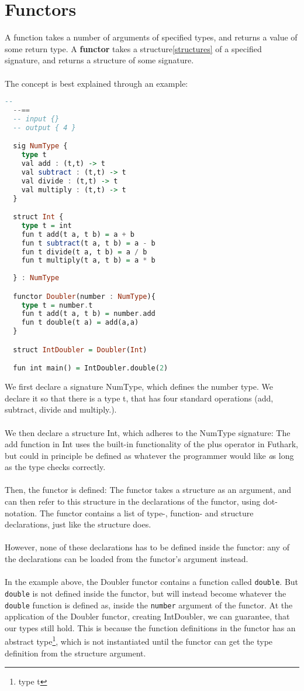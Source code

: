 \section{Functors}
\label{sec:functors}
A function takes a number of arguments of specified types, and returns a value of some return type.
A \textbf{functor} takes a structure\ref{structures} of a specified signature,
and returns a structure of some signature.
\\
\\
The concept is best explained through an example:
\begin{lstlisting}[language=Haskell]
  --
  --==
  -- input {}
  -- output { 4 }

  sig NumType {
    type t
    val add : (t,t) -> t
    val subtract : (t,t) -> t
    val divide : (t,t) -> t
    val multiply : (t,t) -> t
  }

  struct Int {
    type t = int
    fun t add(t a, t b) = a + b
    fun t subtract(t a, t b) = a - b
    fun t divide(t a, t b) = a / b
    fun t multiply(t a, t b) = a * b
    
  } : NumType

  functor Doubler(number : NumType){
    type t = number.t
    fun t add(t a, t b) = number.add
    fun t double(t a) = add(a,a) 
  }

  struct IntDoubler = Doubler(Int)

  fun int main() = IntDoubler.double(2)
\end{lstlisting}
We first declare a signature NumType, which defines the number type. We declare it so
that there is a type t, that has four standard operations (add, subtract, divide
and multiply.).
\\
\\
We then declare a structure Int, which adheres to the NumType signature:
The add function in Int uses the built-in functionality of the plus operator in
Futhark, but could in principle be defined as whatever the programmer would
like \emph as long as the type checks correctly.
\\
\\
Then, the functor is defined: The functor takes a structure as an argument, and
can then refer to this structure in the declarations of the functor, using
dot-notation.
The functor contains a list of type-, function- and structure declarations, just
like the structure does.
\\
\\
However, none of these declarations has to be defined inside the functor: any of the declarations can be loaded from the functor's argument instead.
\\
\\
In the example above, the Doubler functor contains a function called
\texttt{double}. But \texttt{double} is not defined inside the functor, but will
instead become whatever the \texttt{double} function is defined as, inside the \texttt{number}
argument of the functor.
At the application of the Doubler functor, creating IntDoubler, we can
guarantee, that our types still hold. This is because the function definitions
in the functor has an abstract type\footnote{type t}, which is not instantiated
until the functor can get the type definition from the structure argument.


